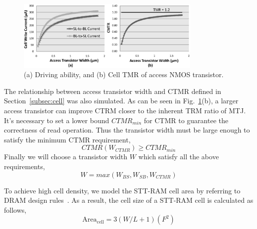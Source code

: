 \begin{figure}[t]
  \centering
  \includegraphics[width=3.5in]{fig/HSPICE.eps}
  \caption{(a) Driving ability, and (b) Cell TMR of access NMOS transistor.}
  \label{fig:hspice}
  \vspace{-15pt}
\end{figure}

The relationship between access transistor width and CTMR defined in Section~\ref{subsec:cell} was also simulated. As can be seen in Fig.~\ref{fig:hspice}(b), a larger access transistor can improve CTRM closer to the inherent TRM ratio of MTJ. It's necessary to set a lower bound $CTMR_{min}$ for CTMR to guarantee the correctness of read operation. Thus the transistor width must be large enough to satisfy the minimum CTMR requirement,
\begin{equation}
CTMR(W_{CTMR}) \geq CTMR_{min}
\end{equation}
Finally we will choose a transistor width $W$ which satisfy all the above requirements,
\begin{equation}
W = max(W_{BS}, W_{SB}, W_{CTMR}) \label{equ:width}
\end{equation}

To achieve high cell density, we model the STT-RAM cell area by referring to DRAM design rules~\cite{DRAM:6F2}.  As a result, the cell size of a STT-RAM cell is calculated as follows,
\begin{equation}
\mathrm{Area}_{\mathrm{cell}}={3\left(W/L+1\right)}(F^2)
\end{equation}

